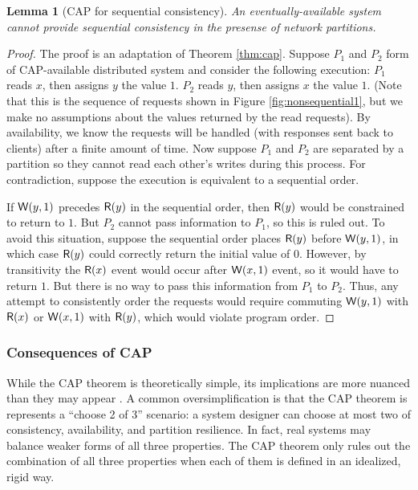\documentclass[]             %
{NASA}                       %
\newtheorem{lemma}[theorem]{Lemma}
\theoremstyle{definition}
\begin{document}
\begin{lemma}[CAP for sequential consistency]
  \label{thm:cap-sequential}
  An eventually-available system cannot provide sequential consistency
  in the presense of network partitions.
\end{lemma}
\begin{proof}
  The proof is an adaptation of Theorem \ref{thm:cap}. Suppose $P_1$
  and $P_2$ form of CAP-available distributed system and consider the
  following execution: $P_1$ reads $x$, then assigns $y$ the value
  $1$. $P_2$ reads $y$, then assigns $x$ the value $1$. (Note that
  this is the sequence of requests shown in Figure
  \ref{fig:nonsequential1}, but we make no assumptions about the
  values returned by the read requests). By availability, we know the
  requests will be handled (with responses sent back to clients) after
  a finite amount of time. Now suppose $P_1$ and $P_2$ are separated
  by a partition so they cannot read each other's writes during this
  process. For contradiction, suppose the execution is equivalent to a
  sequential order.

  If $\mathsf{W}\!\left(y, 1\right)$ precedes $\mathsf{R}\!\left(y\right)$ in the sequential order,
  then $\mathsf{R}\!\left(y\right)$ would be constrained to return to $1$. But $P_2$
  cannot pass information to $P_1$, so this is ruled out. To avoid
  this situation, suppose the sequential order places $\mathsf{R}\!\left(y\right)$
  before $\mathsf{W}\!\left(y, 1\right)$, in which case $\mathsf{R}\!\left(y\right)$ could
  correctly return the initial value of $0$. However, by transitivity
  the $\mathsf{R}\!\left(x\right)$ event would occur after $\mathsf{W}\!\left(x, 1\right)$ event,
  so it would have to return $1$. But there is no way to pass this
  information from $P_1$ to $P_2$. Thus, any attempt to consistently
  order the requests would require commuting $\mathsf{W}\!\left(y, 1\right)$ with
  $\mathsf{R}\!\left(x\right)$ or $\mathsf{W}\!\left(x, 1\right)$ with $\mathsf{R}\!\left(y\right)$, which would
  violate program order.
\end{proof}

\subsubsection{Consequences of CAP}
\label{interpretation-of-the-cap-theorem}
While the CAP theorem is theoretically simple, its implications are
more nuanced than they may appear \cite{2012CAP12Years}. A common
oversimplification is that the CAP theorem is represents a ``choose 2
of 3'' scenario: a system designer can choose at most two of
consistency, availability, and partition resilience. In fact, real
systems may balance weaker forms of all three properties. The CAP
theorem only rules out the combination of all three properties when
each of them is defined in an idealized, rigid way.
\end{document}
